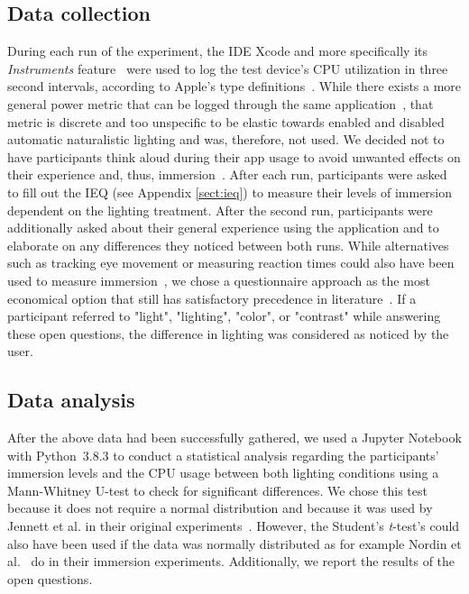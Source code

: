 \documentclass[12pt,twoside,english]{article}
\begin{document}
\subsection{Data collection}
\label{sect:data_collection}

During each run of the experiment, the \gls{IDE} Xcode and more specifically its \textit{Instruments} feature~\cite{apple_xcode_2020} were used to log the test device's \gls{CPU} utilization in three second intervals, according to Apple's type definitions~\cite{apple_system_2020}.
While there exists a more general power metric that can be logged through the same application~\cite{apple_energy_2020-1}, that metric is discrete and too unspecific to be elastic towards enabled and disabled automatic naturalistic lighting and was, therefore, not used.
We decided not to have participants think aloud during their app usage to avoid unwanted effects on their experience and, thus, immersion~\cite{van_den_haak_retrospective_2003}.
After each run, participants were asked to fill out the \gls{IEQ} (see Appendix \ref{sect:ieq}) to measure their levels of immersion dependent on the lighting treatment.
After the second run, participants were additionally asked about their general experience using the application and to elaborate on any differences they noticed between both runs.
While alternatives such as tracking eye movement or measuring reaction times could also have been used to measure immersion~\cite{jennett_measuring_2008}, we chose a questionnaire approach as the most economical option that still has satisfactory precedence in literature~\cite{boyle_engagement_2012}.
If a participant referred to "light", "lighting", "color", or "contrast" while answering these open questions, the difference in lighting was considered as noticed by the user.

\subsection{Data analysis}
\label{sect:data_analysis}

After the above data had been successfully gathered, we used a Jupyter Notebook with Python~3.8.3 to conduct a statistical analysis regarding the participants' immersion levels and the \gls{CPU} usage between both lighting conditions using a Mann-Whitney U-test to check for significant differences.
We chose this test because it does not require a normal distribution and because it was used by Jennett et al. in their original experiments~\cite{jennett_measuring_2008}.
However, the Student's \textit{t}-test's could also have been used if the data was normally distributed as for example Nordin et al.~\cite{nordin_attention_2013} do in their immersion experiments.
Additionally, we report the results of the open questions.
\end{document}
